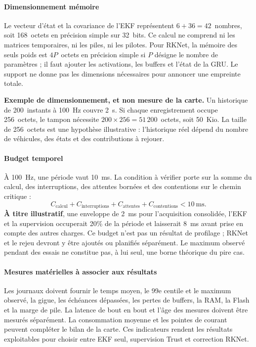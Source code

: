 \documentclass[11pt,a4paper]{article}
\renewcommand{\strong}[1]{\textbf{#1}}
\begin{document}
\paragraph{Dimensionnement mémoire}
Le vecteur d'état et la covariance de l'EKF représentent $6+36=42$~nombres, soit 168~octets en précision simple sur 32~bits. Ce calcul ne comprend ni les matrices temporaires, ni les piles, ni les pilotes. Pour RKNet, la mémoire des seuls poids est $4P$~octets en précision simple si $P$ désigne le nombre de paramètres ; il faut ajouter les activations, les buffers et l'état de la GRU. Le support ne donne pas les dimensions nécessaires pour annoncer une empreinte totale.

\strong{Exemple de dimensionnement, et non mesure de la carte.} Un historique de 200~instants à 100~Hz couvre 2~s. Si chaque enregistrement occupe 256~octets, le tampon nécessite $200\times256=51\,200$~octets, soit 50~Kio. La taille de 256~octets est une hypothèse illustrative : l'historique réel dépend du nombre de véhicules, des états et des contributions à rejouer.

\paragraph{Budget temporel}
À 100~Hz, une période vaut 10~ms. La condition à vérifier porte sur la somme du calcul, des interruptions, des attentes bornées et des contentions sur le chemin critique :
\begin{equation}
C_{\mathrm{calcul}}+C_{\mathrm{interruptions}}+
C_{\mathrm{attentes}}+C_{\mathrm{contentions}}<10~\mathrm{ms}.
\end{equation}
\strong{À titre illustratif}, une enveloppe de 2~ms pour l'acquisition consolidée, l'EKF et la supervision occuperait 20\% de la période et laisserait 8~ms avant prise en compte des autres charges. Ce budget n'est pas un résultat de profilage ; RKNet et le rejeu devront y être ajoutés ou planifiés séparément. Le maximum observé pendant des essais ne constitue pas, à lui seul, une borne théorique du pire cas.

\paragraph{Mesures matérielles à associer aux résultats}
Les journaux doivent fournir le temps moyen, le 99e centile et le maximum observé, la gigue, les échéances dépassées, les pertes de buffers, la RAM, la Flash et la marge de pile. La latence de bout en bout et l'âge des mesures doivent être mesurés séparément. La consommation moyenne et les pointes de courant peuvent compléter le bilan de la carte. Ces indicateurs rendent les résultats exploitables pour choisir entre EKF seul, supervision Trust et correction RKNet.
\FloatBarrier
\end{document}
